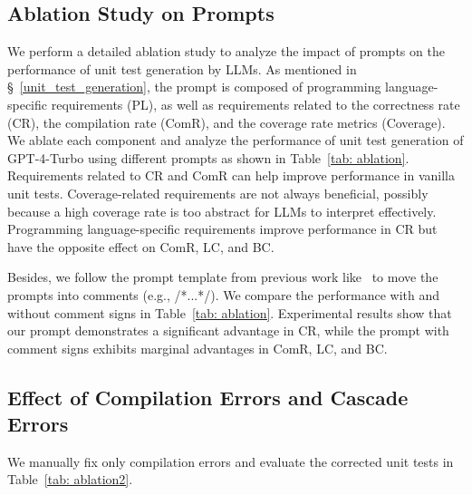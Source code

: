 \subsection{Ablation Study on Prompts}
\label{sec: ablation}

We perform a detailed ablation study to analyze the impact of prompts on the performance of unit test generation by LLMs.
As mentioned in \S~\ref{unit_test_generation}, the prompt is composed of programming language-specific requirements (PL), as well as requirements related to the correctness rate (CR), the compilation rate (ComR), and the coverage rate metrics (Coverage). We ablate each component and analyze the performance of unit test generation of GPT-4-Turbo using different prompts as shown in Table~\ref{tab: ablation}. 
Requirements related to CR and ComR can help improve performance in vanilla unit tests. 
Coverage-related requirements are not always beneficial, possibly because a high coverage rate is too abstract for LLMs to interpret effectively.
Programming language-specific requirements improve performance in CR but have the opposite effect on ComR, LC, and BC.

Besides, we follow the prompt template from previous work like~\citet{siddiq2024using} to move the prompts into comments (e.g., /*...*/). We compare the performance with and without comment signs in Table~\ref{tab: ablation}. Experimental results show that our prompt demonstrates a significant advantage in CR, while the prompt with comment signs exhibits marginal advantages in ComR, LC, and BC.


\subsection{Effect of Compilation Errors and Cascade Errors}
\label{appendix: alabtion_compilation}

We manually fix only compilation errors and evaluate the corrected unit tests in Table~\ref{tab: ablation2}.

